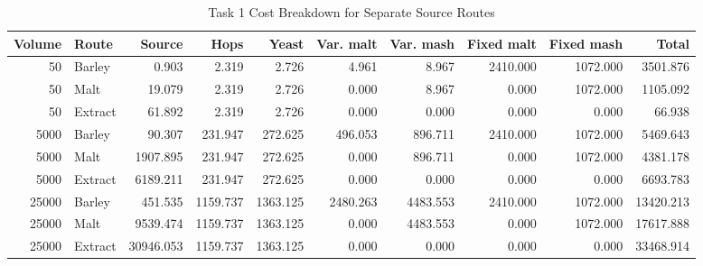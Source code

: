 \begin{table}[H]
\renewcommand{\arraystretch}{1.12}
\caption{Task 1 Cost Breakdown for Separate Source Routes}
\label{tab:task31-cost-breakdown}
\centering
\scriptsize
\setlength{\tabcolsep}{3pt}
\begin{tabular}{@{}rlrrrrrrrr@{}}
\toprule
Volume & Route & Source & Hops & Yeast & Var. malt & Var. mash & Fixed malt & Fixed mash & Total \\
\midrule
50 & Barley & 0.903 & 2.319 & 2.726 & 4.961 & 8.967 & 2410.000 & 1072.000 & 3501.876 \\
50 & Malt & 19.079 & 2.319 & 2.726 & 0.000 & 8.967 & 0.000 & 1072.000 & 1105.092 \\
50 & Extract & 61.892 & 2.319 & 2.726 & 0.000 & 0.000 & 0.000 & 0.000 & 66.938 \\
5000 & Barley & 90.307 & 231.947 & 272.625 & 496.053 & 896.711 & 2410.000 & 1072.000 & 5469.643 \\
5000 & Malt & 1907.895 & 231.947 & 272.625 & 0.000 & 896.711 & 0.000 & 1072.000 & 4381.178 \\
5000 & Extract & 6189.211 & 231.947 & 272.625 & 0.000 & 0.000 & 0.000 & 0.000 & 6693.783 \\
25000 & Barley & 451.535 & 1159.737 & 1363.125 & 2480.263 & 4483.553 & 2410.000 & 1072.000 & 13420.213 \\
25000 & Malt & 9539.474 & 1159.737 & 1363.125 & 0.000 & 4483.553 & 0.000 & 1072.000 & 17617.888 \\
25000 & Extract & 30946.053 & 1159.737 & 1363.125 & 0.000 & 0.000 & 0.000 & 0.000 & 33468.914 \\
\bottomrule
\end{tabular}
\end{table}
